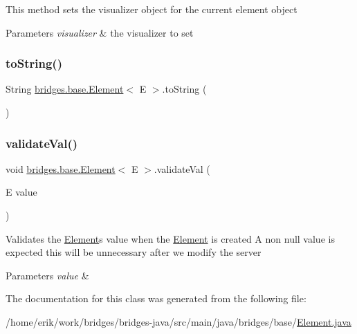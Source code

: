 This method sets the visualizer object for the current element object


\begin{DoxyParams}{Parameters}
{\em visualizer} & the visualizer to set \\
\hline
\end{DoxyParams}
\mbox{\label{classbridges_1_1base_1_1_element_a7dc685e317fd9dc2e73e049a9f907e42}} 
\subsubsection{\texorpdfstring{to\+String()}{toString()}}
{\footnotesize\ttfamily String \hyperlink{classbridges_1_1base_1_1_element}{bridges.\+base.\+Element}$<$ E $>$.to\+String (\begin{DoxyParamCaption}{ }\end{DoxyParamCaption})}

\mbox{\label{classbridges_1_1base_1_1_element_af1a60f4e6a91d379179f7d56e6dc3829}} 
\subsubsection{\texorpdfstring{validate\+Val()}{validateVal()}}
{\footnotesize\ttfamily void \hyperlink{classbridges_1_1base_1_1_element}{bridges.\+base.\+Element}$<$ E $>$.validate\+Val (\begin{DoxyParamCaption}\item[{E}]{value }\end{DoxyParamCaption})\hspace{0.3cm}{\ttfamily [protected]}}

Validates the \hyperlink{classbridges_1_1base_1_1_element}{Element}\textquotesingle{}s value when the \hyperlink{classbridges_1_1base_1_1_element}{Element} is created A non null value is expected this will be unnecessary after we modify the server 
\begin{DoxyParams}{Parameters}
{\em value} & \\
\hline
\end{DoxyParams}


The documentation for this class was generated from the following file\+:\begin{DoxyCompactItemize}
\item 
/home/erik/work/bridges/bridges-\/java/src/main/java/bridges/base/\hyperlink{_element_8java}{Element.\+java}\end{DoxyCompactItemize}

